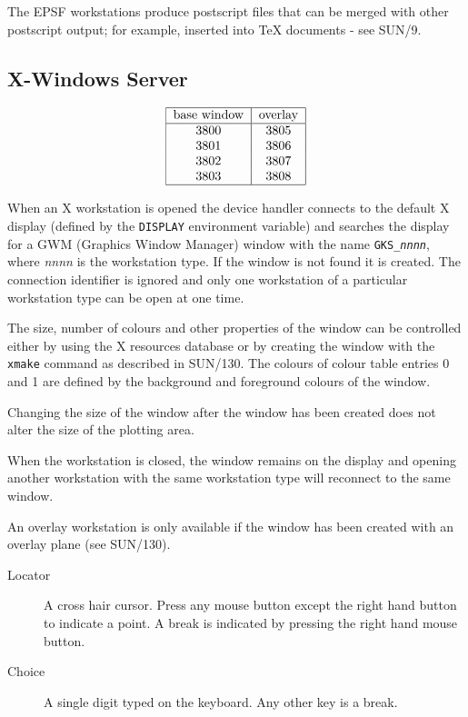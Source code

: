 \documentclass[11pt]{article}
\newcommand{\xref}[3]{#1}
\begin{document}
The EPSF workstations produce postscript files that can be merged with other
postscript output; for example, inserted into TeX documents - see
\xref{SUN/9}{sun9}{}.

\subsection{X-Windows Server}
\label{xwin}


\[\begin{tabular}{|c|c|}\hline
base window &overlay\\\hline
3800 &3805 \\
3801 &3806 \\
3802 &3807 \\
3803 &3808 \\\hline
\end{tabular}\]


When an X workstation is opened the device handler connects to the
default X display (defined by the {\tt DISPLAY} environment variable)
and searches the display for a GWM
(\xref{Graphics Window Manager}{sun130}{}) window
with the name {\tt GKS\_{\em{nnnn}}},
where {\em nnnn} is the workstation type. If the window is
not found it is created. The connection
identifier is ignored and only one workstation of a particular
workstation type can be open at one time.

The size, number of colours and other properties of the window can be
controlled either by using the X resources database or by creating the
window with the {\tt xmake} command as described in SUN/130. The colours
of colour table entries 0 and 1 are defined by the background and
foreground colours of the window.

Changing the size of the window after the window has been created does
not alter the size of the plotting area.

When the workstation is closed, the window remains on the display and
opening another workstation with the same workstation type will
reconnect to the same window.

An overlay workstation is only available if the window has been created
with an overlay plane (see \xref{SUN/130}{sun130}{xmakeCommand}).


\begin{description}
\item[Locator] A cross hair cursor.
Press any mouse button except the right hand button to indicate a point. A
break is indicated by pressing the right hand mouse button.
\item[Choice] A single digit typed on the keyboard.
Any other key is a break.
\end{description}
\end{document}
